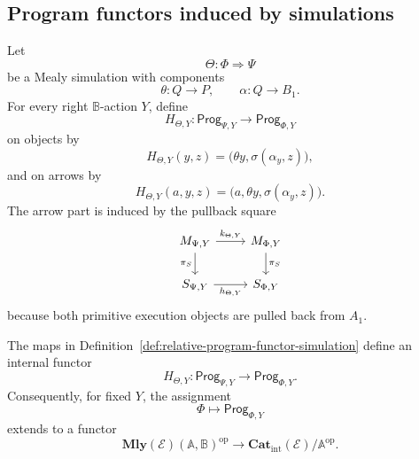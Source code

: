 \subsection{Program functors induced by simulations}
\label{subsec:relative-program-functors-simulations}

\begin{definition}
\label{def:relative-program-functor-simulation}
Let
\[
\Theta:\Phi\Rightarrow\Psi
\]
be a Mealy simulation with components
\[
\theta:Q\to P,
\qquad
\alpha:Q\to B_1.
\]
For every right \(\mathbb B\)-action \(Y\), define
\[
H_{\Theta,Y}:
\mathsf{Prog}_{\Psi,Y}
\to
\mathsf{Prog}_{\Phi,Y}
\]
on objects by
\[
H_{\Theta,Y}(y,z)
=
\bigl(\theta y,\sigma(\alpha_y,z)\bigr),
\]
and on arrows by
\[
H_{\Theta,Y}(a,y,z)
=
\bigl(a,\theta y,\sigma(\alpha_y,z)\bigr).
\]
The arrow part is induced by the pullback square
\[
\begin{tikzcd}
M_{\Psi,Y}
\arrow[r,"k_{\Theta,Y}"]
\arrow[d,"\pi_S"']
&
M_{\Phi,Y}
\arrow[d,"\pi_S"]
\\
S_{\Psi,Y}
\arrow[r,"h_{\Theta,Y}"']
&
S_{\Phi,Y}
\end{tikzcd}
\]
because both primitive execution objects are pulled back from \(A_1\).
\end{definition}

\begin{theorem}
\label{thm:relative-simulations-program-functors}
The maps in Definition~\ref{def:relative-program-functor-simulation} define an
internal functor
\[
H_{\Theta,Y}:
\mathsf{Prog}_{\Psi,Y}
\to
\mathsf{Prog}_{\Phi,Y}.
\]
Consequently, for fixed \(Y\), the assignment
\[
\Phi\longmapsto\mathsf{Prog}_{\Phi,Y}
\]
extends to a functor
\[
\mathbf{Mly}(\mathcal E)(\mathbb A,\mathbb B)^{\mathrm{op}}
\longrightarrow
\mathbf{Cat}_{\mathrm{int}}(\mathcal E)/\mathbb A^{\mathrm{op}}.
\]
\end{theorem}

